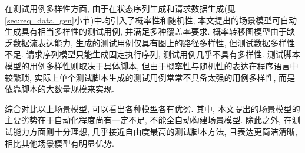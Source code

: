         在测试用例多样性方面, 由于在状态序列生成和请求数据生成(见\ref{sec:req_data_gen}小节)中均引入了概率性和随机性, 本文提出的场景模型可自动生成具有相当多样性的测试用例, 并满足多种覆盖率要求. 概率转移图模型由于缺乏数据流表达能力, 生成的测试用例仅具有图上的路径多样性, 但测试数据多样性不足. 请求序列模型只能生成固定执行序列, 测试用例几乎不具有多样性. 测试脚本模型的用例多样性则取决于具体脚本, 但由于概率性与随机性的表达在程序语言中较繁琐, 实际上单个测试脚本生成的测试用例常常不具备太强的用例多样性, 而是依靠脚本的大数量规模来实现.
        
        综合对比以上场景模型, 可以看出各种模型各有优劣. 其中, 本文提出的场景模型的主要劣势在于自动化程度尚有一定不足, 不能全自动构建场景模型. 除此之外, 在测试能力方面则十分理想, 几乎接近自由度最高的测试脚本方法, 且表达更简洁清晰, 相比其他场景模型有明显优势.
    
